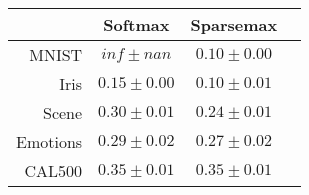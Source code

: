 \begin{tabular}{r|ccc}
& Softmax & Sparsemax \\
\hline
MNIST & $inf \pm nan$ & $0.10 \pm 0.00$ \\
Iris & $0.15 \pm 0.00$ & $0.10 \pm 0.01$ \\
Scene & $0.30 \pm 0.01$ & $0.24 \pm 0.01$ \\
Emotions & $0.29 \pm 0.02$ & $0.27 \pm 0.02$ \\
CAL500 & $0.35 \pm 0.01$ & $0.35 \pm 0.01$ \\
\end{tabular}
